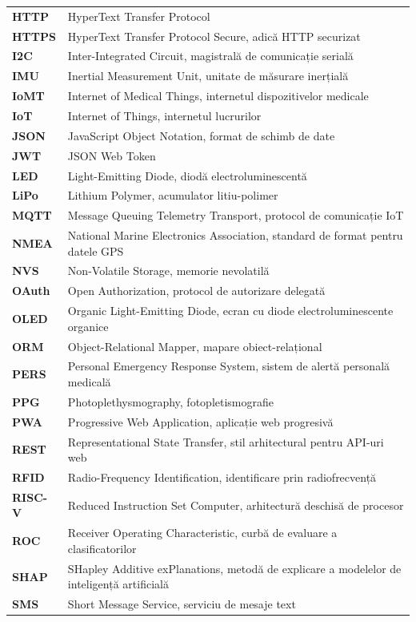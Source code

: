 \documentclass[12pt,a4paper,twoside]{article}
\begin{document}
{\begin{longtable}{@{}>{\bfseries}p{2.7cm}p{10.6cm}@{}}
HTTP & HyperText Transfer Protocol\\
HTTPS & HyperText Transfer Protocol Secure, adică HTTP securizat\\
I2C & Inter-Integrated Circuit, magistrală de comunicație serială\\
IMU & Inertial Measurement Unit, unitate de măsurare inerțială\\
IoMT & Internet of Medical Things, internetul dispozitivelor medicale\\
IoT & Internet of Things, internetul lucrurilor\\
JSON & JavaScript Object Notation, format de schimb de date\\
JWT & JSON Web Token\\
LED & Light-Emitting Diode, diodă electroluminescentă\\
LiPo & Lithium Polymer, acumulator litiu-polimer\\
MQTT & Message Queuing Telemetry Transport, protocol de comunicație IoT\\
NMEA & National Marine Electronics Association, standard de format pentru datele GPS\\
NVS & Non-Volatile Storage, memorie nevolatilă\\
OAuth & Open Authorization, protocol de autorizare delegată\\
OLED & Organic Light-Emitting Diode, ecran cu diode electroluminescente organice\\
ORM & Object-Relational Mapper, mapare obiect-relațional\\
PERS & Personal Emergency Response System, sistem de alertă personală medicală\\
PPG & Photoplethysmography, fotopletismografie\\
PWA & Progressive Web Application, aplicație web progresivă\\
REST & Representational State Transfer, stil arhitectural pentru API-uri web\\
RFID & Radio-Frequency Identification, identificare prin radiofrecvență\\
RISC-V & Reduced Instruction Set Computer, arhitectură deschisă de procesor\\
ROC & Receiver Operating Characteristic, curbă de evaluare a clasificatorilor\\
SHAP & SHapley Additive exPlanations, metodă de explicare a modelelor de inteligență artificială\\
SMS & Short Message Service, serviciu de mesaje text\\

\end{longtable}}
\end{document}
